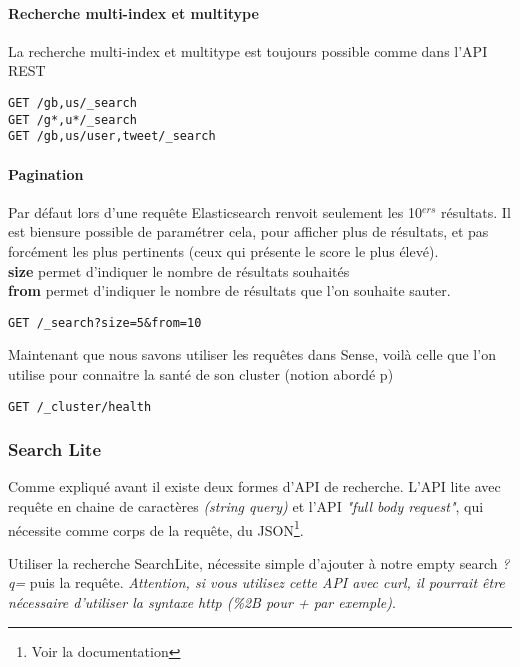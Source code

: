 {\paragraph{Recherche multi-index et multitype}
La recherche multi-index et multitype est toujours possible comme dans l'API REST

\begin{lstlisting}[style=code,label={lst:APIsearchemptyexample4},caption={Une recherche multi-index ...}]
GET /gb,us/_search
GET /g*,u*/_search
GET /gb,us/user,tweet/_search
\end{lstlisting}

\paragraph{Pagination}
Par défaut lors d'une requête Elasticsearch renvoit seulement les 10$^{ers}$ résultats.
Il est biensure possible de paramétrer cela, pour afficher plus de résultats, et pas
forcément les plus pertinents (ceux qui présente le score le plus élevé).\\
\textbf{size} permet d'indiquer le nombre de résultats souhaités\\
\textbf{from} permet d'indiquer le nombre de résultats que l'on souhaite sauter.

\begin{lstlisting}[style=code,label={lst:APIsearchemptyexample4},caption={Pagination}]
GET /_search?size=5&from=10
\end{lstlisting}

Maintenant que nous savons utiliser les requêtes dans Sense, voilà celle que l'on
utilise pour connaitre la santé de son cluster (notion abordé p\pageref{subsec:labase})

\begin{lstlisting}[style=code,label={lst:elastichealth},caption={Santé du cluster}]
GET /_cluster/health
\end{lstlisting}


\subsubsection{Search Lite}
\label{subsec:elasticsearchlite}
Comme expliqué avant il existe deux formes d'API de recherche. L'API lite avec requête
en chaine de caractères \textit{(string query)} et l'API \textit{"full body request"},
qui nécessite comme corps de la requête, du JSON\footnote{Voir la documentation}.

Utiliser la recherche SearchLite, nécessite simple d'ajouter à notre
empty search \emph{?q=} puis la requête. 
\emph{Attention, si vous utilisez cette API avec 
curl, \emph{il pourrait être nécessaire d'utiliser la syntaxe http} (\%2B pour + par exemple)}.

}
